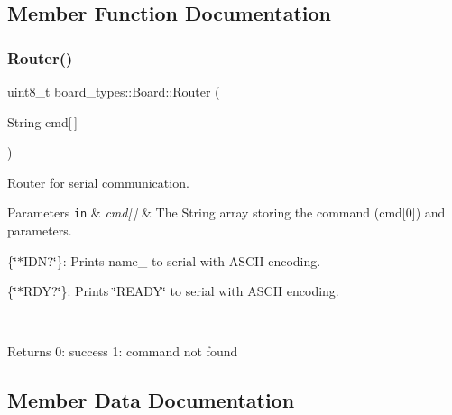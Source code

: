 \subsection{Member Function Documentation}
\mbox{\label{classboard__types_1_1Board_acd50f8de221d5b3fd978484efbf5198e}} 
\subsubsection{\texorpdfstring{Router()}{Router()}}
{\footnotesize\ttfamily uint8\+\_\+t board\+\_\+types\+::\+Board\+::\+Router (\begin{DoxyParamCaption}\item[{String}]{cmd\mbox{[}$\,$\mbox{]} }\end{DoxyParamCaption})\hspace{0.3cm}{\ttfamily [inline]}}

Router for serial communication. 
\begin{DoxyParams}[1]{Parameters}
\mbox{\tt in}  & {\em cmd\mbox{[}$\,$\mbox{]}} & The String array storing the command (cmd\mbox{[}0\mbox{]}) and parameters.
\begin{DoxyItemize}
\item \{\char`\"{}$\ast$\+I\+D\+N?\char`\"{}\}\+: Prints name\+\_\+ to serial with A\+S\+C\+II encoding.
\item \{\char`\"{}$\ast$\+R\+D\+Y?\char`\"{}\}\+: Prints \char`\"{}\+R\+E\+A\+D\+Y\char`\"{} to serial with A\+S\+C\+II encoding. 
\end{DoxyItemize}\\
\hline
\end{DoxyParams}
\begin{DoxyReturn}{Returns}
0\+: success 1\+: command not found 
\end{DoxyReturn}


\subsection{Member Data Documentation}
\mbox{\label{classboard__types_1_1Board_affe2fb94dacf42e9707eedce2ab1f955}} 
